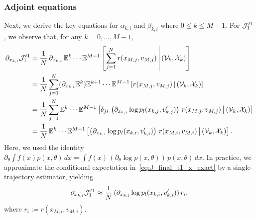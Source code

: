 \documentclass[12pt,nopreprintline]{elsarticle}
\begin{document}
\subsubsection{Adjoint equations} \label{subsec:link_appendx_A}
Next, we derive the key equations for $\alpha_{k,i}$ and $\beta_{k,i}$ where $0\leq k \leq M-1$. For $\mathcal J_1^{t1}$, we observe that, for any $k = 0,\ldots, M-1$,
\begin{align}
\partial_{x_{k,i}} \mathcal J_1^{t1}
&= \frac{1}{N}\,\partial_{x_{k,i}}\, \mathbb E^{k}\cdots \mathbb E^{M-1}
\left[ \sum_{j=1}^N r(x_{M,j}, v_{M,j}) \,\middle|\, (\mathcal V_{k}, \mathcal X_{k}) \right] \nonumber \\
&= \frac{1}{N} \sum^{N}_{j=1}(\partial_{x_{k,i}}\mathbb E^{k}) \mathbb E^{k+1}\cdots \mathbb E^{M-1}
\left[r(x_{M,j}, v_{M,j}) \,\middle|\, (\mathcal V_k,\mathcal X_k)\right] \nonumber \\
&= \frac{1}{N} \sum^{N}_{j=1}\mathbb E^{k}\cdots \mathbb E^{M-1}
\left[  \delta_{j i}\, \left( \partial_{x_{k,i}} \log p_l(x_{k,j}, v'_{k,j})  \right) \, r(x_{M,j}, v_{M,j})
\,\middle|\, (\mathcal V_k,\mathcal X_k) \right]  \nonumber \\
&=  \frac{1}{N}\,\mathbb E^{k}\cdots \mathbb E^{M-1}
\left[
\left( \partial_{x_{k,i}} \log p_l(x_{k,i}, v'_{k,i}) \right)\,
r(x_{M,i}, v_{M,i})
\,\middle|\, (\mathcal V_k,\mathcal X_k)
\right]. \label{eq:J_final_t1_x_exact}
\end{align}
Here, we used the identity $\partial_\theta \int f(x) p(x,\theta)\,dx = \int f(x)\,(\partial_\theta \log p(x,\theta))\,p(x,\theta)\,dx$. In practice, we approximate the conditional expectation in~\eqref{eq:J_final_t1_x_exact} by a single-trajectory estimator, yielding
\begin{equation}
\label{eq:J_final_t1_x}
\partial_{x_{k,i}}\mathcal J_1^{t1} \approx \frac{1}{N}\,
(\partial_{x_{k,i}}\log p_l(x_{k,i},v'_{k,i}))\, r_i,
\end{equation}
where $r_i := r(x_{M,i}, v_{M,i})$.
\end{document}
